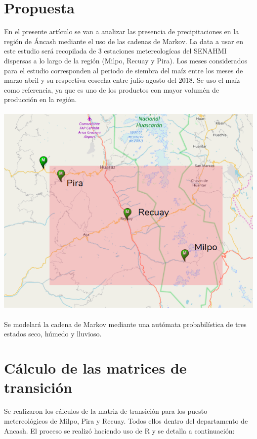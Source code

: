 \documentclass{article}
\begin{document}
\section{Propuesta}

En el presente artículo se van a analizar las presencia de precipitaciones en la región de Áncash mediante el uso de las cadenas de Markov. La data a usar en este estudio será recopilada de 3 estaciones metereologícas del SENAHMI dispersas a lo largo de la región (Milpo, Recuay y Pira). Los meses considerados para el estudio corresponden al periodo de siembra del maíz entre los meses de marzo-abril y su respectiva cosecha entre julio-agosto del 2018. Se uso el maíz como referencia, ya que es uno de los productos con mayor volumén de producción en la región. 
\\\\
\includegraphics[width=\textwidth]{mapa.png}\\\\

Se modelará la cadena de Markov mediante una autómata probabilística de tres estados seco, húmedo y lluvioso.



\section{Cálculo de las matrices de transición}

Se realizaron los cálculos de la matriz de transición para los puesto
metereológicos de Milpo, Pira y Recuay. Todos ellos dentro del
departamento de Ancash. El proceso se realizó haciendo uso de R y se
detalla a continuación:
\end{document}
